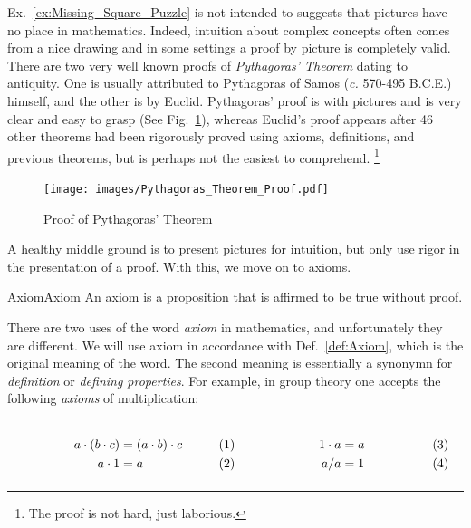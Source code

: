         Ex.~\ref{ex:Missing_Square_Puzzle} is not intended to suggests that
        pictures have no place in mathematics. Indeed, intuition about complex
        concepts often comes from a nice drawing and in some settings a proof by
        picture is completely valid. There are two very well known proofs of
        \textit{Pythagoras' Theorem}%
         dating to antiquity. One is usually
        attributed to Pythagoras of Samos (\textit{c.} 570-495 B.C.E.) himself,
        and the other is by Euclid. Pythagoras' proof is with pictures and is
        very clear and easy to grasp
        (See Fig.~\ref{fig:Proof_Pythagoras_Theorem}), whereas Euclid's proof
        appears after 46 other theorems had been rigorously proved using
        axioms, definitions, and previous theorems, but is perhaps not the
        easiest to comprehend.%
        \footnote{%
            The proof is not hard, just laborious.
        }
        \begin{figure}[H]
            \centering
            \captionsetup{type=figure}
            \texttt{[image: images/Pythagoras\_Theorem\_Proof.pdf]}
            \caption{Proof of Pythagoras' Theorem}
            \label{fig:Proof_Pythagoras_Theorem}
        \end{figure}
        A healthy middle ground is to present pictures for intuition, but only
        use rigor in the presentation of a proof. With this, we move on to
        axioms.
        \begin{fdefinition}{Axiom}{Axiom}
            An \gls{axiom} is a \gls{proposition} that is affirmed to be true
            without \gls{proof}.
        \end{fdefinition}
        There are two uses of the word \textit{axiom} in mathematics, and
        unfortunately they are different. We will use axiom in accordance with
        Def.~\ref{def:Axiom}, which is the original meaning of the word. The
        second meaning is essentially a synonymn for \textit{definition} or
        \textit{defining properties}. For example, in group theory one accepts
        the following \textit{axioms} of multiplication:
        \par
        \begin{subequations}
            \begin{minipage}[b]{0.49\textwidth}
                \begin{align}
                    a\cdot(b\cdot{c})&=(a\cdot{b})\cdot{c}\\
                    a\cdot{1}&=a
                \end{align}
            \end{minipage}
            \hfill
            \begin{minipage}[b]{0.49\textwidth}
                \begin{align}
                    1\cdot{a}&=a\\
                    a/a&=1
                \end{align}
            \end{minipage}
        \end{subequations}
